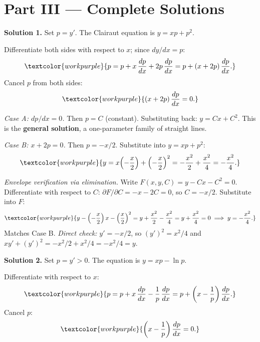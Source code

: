 \clearpage
{}
{}
\section*{Part III --- Complete Solutions}

\noindent\textbf{Solution 1.}\quad
Set $p = y'$. The Clairaut equation is $y = xp + p^2$.

Differentiate both sides with respect to $x$; since $dy/dx = p$:
\[
  \textcolor{workpurple}{p = p + x\,\frac{dp}{dx} + 2p\,\frac{dp}{dx}
  = p + (x + 2p)\,\frac{dp}{dx}.}
\]
Cancel $p$ from both sides:
\[
  \textcolor{workpurple}{(x + 2p)\,\frac{dp}{dx} = 0.}
\]

\textit{Case A: $dp/dx = 0$.}
Then $p = C$ (constant). Substituting back: $y = Cx + C^2$.
This is the \textbf{general solution}, a one-parameter family of straight lines.

\textit{Case B: $x + 2p = 0$.}
Then $p = -x/2$. Substitute into $y = xp + p^2$:
\[
  \textcolor{workpurple}{y = x\!\left(-\frac{x}{2}\right) + \left(-\frac{x}{2}\right)^2
  = -\frac{x^2}{2} + \frac{x^2}{4} = -\frac{x^2}{4}.}
\]

\textit{Envelope verification via elimination.}
Write $F(x,y,C) = y - Cx - C^2 = 0$.
Differentiate with respect to $C$: $\partial F/\partial C = -x - 2C = 0$,
so $C = -x/2$.
Substitute into $F$:
\[
  \textcolor{workpurple}{y - \left(-\frac{x}{2}\right)x - \left(\frac{x}{2}\right)^2
  = y + \frac{x^2}{2} - \frac{x^2}{4} = y + \frac{x^2}{4} = 0
  \;\Longrightarrow\; y = -\frac{x^2}{4}.}
\]
Matches Case B. \textit{Direct check:} $y' = -x/2$, so
$(y')^2 = x^2/4$ and
$xy' + (y')^2 = -x^2/2 + x^2/4 = -x^2/4 = y$. \checkmark

\medskip

\noindent\textbf{Solution 2.}\quad
Set $p = y' > 0$. The equation is $y = xp - \ln p$.

Differentiate with respect to $x$:
\[
  \textcolor{workpurple}{p = p + x\,\frac{dp}{dx} - \frac{1}{p}\,\frac{dp}{dx}
  = p + \left(x - \frac{1}{p}\right)\frac{dp}{dx}.}
\]
Cancel $p$:
\[
  \textcolor{workpurple}{\left(x - \frac{1}{p}\right)\frac{dp}{dx} = 0.}
\]

